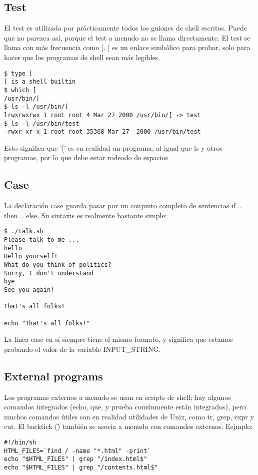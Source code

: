 \documentclass{article}
\begin{document}
\subsection{Test}
El test es utilizada por prácticamente todos los guiones de shell escritos. Puede que no parezca así, porque el test a menudo no se llama directamente. El test se llama con más frecuencia como [. [ es un enlace simbólico para probar, solo para hacer que los programas de shell sean más legibles.
\begin{verbatim}
$ type [
[ is a shell builtin
$ which [
/usr/bin/[
$ ls -l /usr/bin/[
lrwxrwxrwx 1 root root 4 Mar 27 2000 /usr/bin/[ -> test
$ ls -l /usr/bin/test
-rwxr-xr-x 1 root root 35368 Mar 27  2000 /usr/bin/test
\end{verbatim}
Esto significa que '[' es en realidad un programa, al igual que ls y otros programas, por lo que debe estar rodeado de espacios

\subsection{Case}
La declaración case guarda pasar por un conjunto completo de sentencias if .. then .. else. Su sintaxis es realmente bastante simple:
\begin{verbatim}
$ ./talk.sh
Please talk to me ...
hello
Hello yourself!
What do you think of politics?
Sorry, I don't understand
bye
See you again!

That's all folks!

echo "That's all folks!"
\end{verbatim}
La línea case en sí siempre tiene el mismo formato, y significa que estamos probando el valor de la variable INPUT{\_}STRING.

\subsection{External programs}
Los programas externos a menudo se usan en scripts de shell; hay algunos comandos integrados (echo, que, y prueba comúnmente están integrados), pero muchos comandos útiles son en realidad utilidades de Unix, como tr, grep, expr y cut.
\newline
El backtick (\` ) también se asocia a menudo con comandos externos.
\newline
Eejmplo:
\begin{verbatim}
#!/bin/sh
HTML_FILES=`find / -name "*.html" -print`
echo "$HTML_FILES" | grep "/index.html$"
echo "$HTML_FILES" | grep "/contents.html$"
\end{verbatim}
\end{document}
